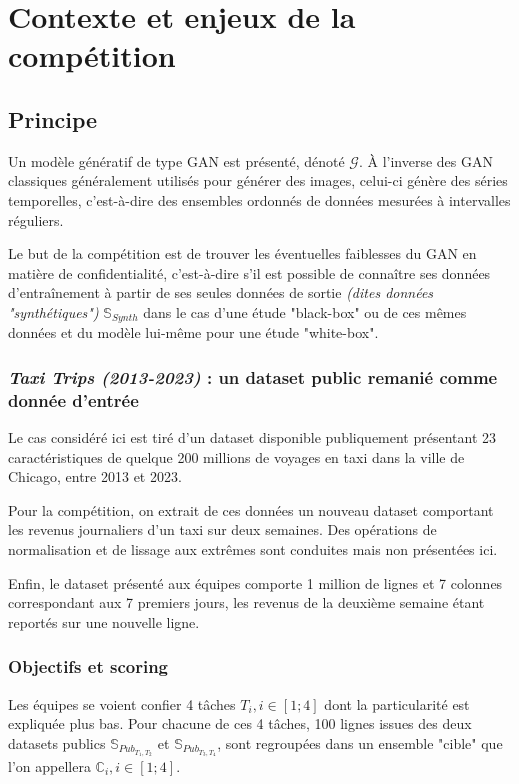 \chapter{Contexte et enjeux de la compétition}
    \section{Principe}

        Un modèle génératif de type GAN est présenté, dénoté $\mathcal G$. À l'inverse des GAN classiques généralement utilisés pour générer des images, celui-ci génère des séries temporelles, c'est-à-dire des ensembles ordonnés de données mesurées à intervalles réguliers.

        Le but de la compétition est de trouver les éventuelles faiblesses du GAN en matière de confidentialité, c'est-à-dire s'il est possible de connaître ses données d'entraînement à partir de ses seules données de sortie \textit{(dites données "synthétiques")} $\mathbb S_{Synth}$ dans le cas d'une étude "black-box" ou de ces mêmes données et du modèle lui-même pour une étude "white-box".

        \subsection{\textit{Taxi Trips (2013-2023)} : un dataset public remanié comme donnée d'entrée}
            Le cas considéré ici est tiré d'un dataset disponible publiquement présentant 23 caractéristiques de quelque 200 millions de voyages en taxi dans la ville de Chicago, entre 2013 et 2023.

            Pour la compétition, on extrait de ces données un nouveau dataset comportant les revenus journaliers d'un taxi sur deux semaines. Des opérations de normalisation et de lissage aux extrêmes sont conduites mais non présentées ici.

            Enfin, le dataset présenté aux équipes comporte 1 million de lignes et 7 colonnes
            correspondant aux 7 premiers jours, les revenus de la deuxième semaine étant reportés
            sur
            une nouvelle ligne.
        \subsection{Objectifs et scoring}
            Les équipes se voient confier 4 tâches $T_i, i\in \left[1;4\right]$ dont la particularité est expliquée plus bas. Pour chacune de ces 4 tâches, 100 lignes issues des deux datasets publics $\mathbb{S}_{Pub_{T_1, T_2}}$ et $\mathbb{S}_{Pub_{T_3, T_4}}$, sont regroupées dans un ensemble "cible" que l'on appellera $\mathbb{C}_i, i\in\left[1;4\right]$.

